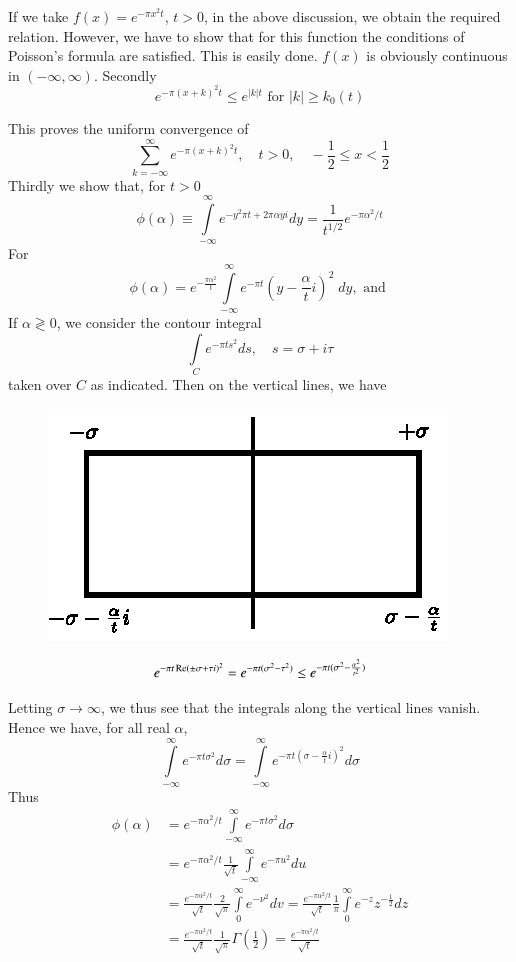 \medskip
{}
If we take $f(x) =e^{-\pi x^2t}$, $t >0$, in the above discussion, we
obtain the required relation. However, we have to show that for this
function the conditions of Poisson's formula are satisfied. This is
easily done. $f(x)$ is obviously continuous in $(-\infty,
\infty)$. Secondly
$$
e^{-\pi(x+k)^2t} \leq e^{|k|t} \text{ for } |k| \geq k_0 (t)
$$

This proves the uniform convergence of 
$$
\sum\limits^\infty_{k=-\infty} e^{-\pi(x+k)^2t} , \quad t >0,\quad -
\frac{1}{2} \leq x < \frac{1}{2}
$$
Thirdly we show that, for $t>0$
$$
\phi(\alpha) \equiv \int\limits^\infty_{-\infty} e^{-y^2 \pi t + 2 \pi
\alpha yi} dy = \frac{1}{t^{1/2}} e^{-\pi \alpha^2/t}
$$
For\pageoriginale
$$
\phi (\alpha) = e^{-\frac{\pi \alpha^2}{t}}
\int\limits^\infty_{-\infty} e^{-\pi t} \left(y-\frac{\alpha}{t}i
\right)^2 \; dy, \text{ and }
$$
If $\alpha \gtrless 0$, we consider the contour integral
$$
\int\limits_C e^{-\pi t s^2} ds, \quad s = \sigma + i \tau
$$
taken over $C$ as indicated. Then on the vertical lines, we have
\begin{figure}[H]
\centering
\includegraphics{figures/fig12.1.eps}
\end{figure}
$$
e^{-\pi t \operatorname{Re} (\pm \sigma + \tau i)^2}  = e^{-\pi t (\sigma^2 -
  \tau^2) } \leq e^{-\pi t (\sigma^2 - \frac{\alpha^2}{t^2})} 
$$

Letting $\sigma \to \infty$, we thus see that the integrals along the
vertical lines vanish. Hence we have, for all real $\alpha$,
$$
\int\limits^\infty_{-\infty} e^{-\pi t \sigma^2} d\sigma =
\int\limits^\infty_{-\infty} e^{-\pi t (\sigma - \frac{\alpha}{t}i)^2}
d \sigma
$$
Thus
\begin{align*}
\phi (\alpha) & = e^{-\pi \alpha^2/t} \int\limits^\infty_{-\infty}
e^{-\pi t \sigma^2} d\sigma\\
& = e^{-\pi \alpha^2/t} \frac{1}{\sqrt{t}} \int\limits^\infty_{-\infty}
e^{-\pi u^2 } du\\
& = \frac{e^{-\pi \alpha^2 /t}}{\sqrt{t}} \frac{2}{\sqrt{\pi}}
\int\limits^\infty_0 e^{-\nu^2} dv = \frac{e^{-\pi \alpha^2/t}}{\sqrt{t}} \frac{1}{\pi} \int\limits^\infty_{0} e^{-z} z^{-\frac{1}{2}} dz\\
& = \frac{e^{-\pi\alpha^2/t}}{\sqrt{t}} \frac{1}{\sqrt{\pi}} \Gamma
\left(\frac{1}{2}\right) = \frac{e^{-\pi \alpha^2/t}}{\sqrt{t}}
\end{align*}

